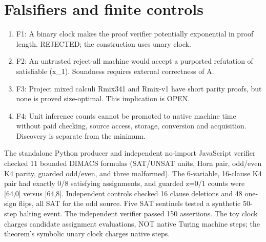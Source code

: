 \documentclass[11pt]{article}
\begin{document}
\section{Falsifiers and finite controls}
\begin{enumerate}
\item[] F1: A binary clock makes the proof verifier potentially exponential in proof length. REJECTED; the construction uses unary clock.
\item[] F2: An untrusted reject-all machine would accept a purported refutation of satisfiable (x_1). Soundness requires external correctness of A.
\item[] F3: Project mixed calculi Rmix341 and Rmix-v1 have short parity proofs, but none is proved size-optimal. This implication is OPEN.
\item[] F4: Unit inference counts cannot be promoted to native machine time without paid checking, source access, storage, conversion and acquisition. Discovery is separate from the minimum.
\end{enumerate}
The standalone Python producer and independent no-import JavaScript verifier checked 11 bounded DIMACS formulas (SAT/UNSAT units, Horn pair, odd/even K4 parity, guarded odd/even, and three malformed). The 6-variable, 16-clause K4 pair had exactly 0/8 satisfying assignments, and guarded z=0/1 counts were [64,0] versus [64,8]. Independent controls checked 16 clause deletions and 48 one-sign flips, all SAT for the odd source. Five SAT sentinels tested a synthetic 50-step halting event. The independent verifier passed 150 assertions. The toy clock charges candidate assignment evaluations, NOT native Turing machine steps; the theorem's symbolic unary clock charges native steps.
\end{document}
